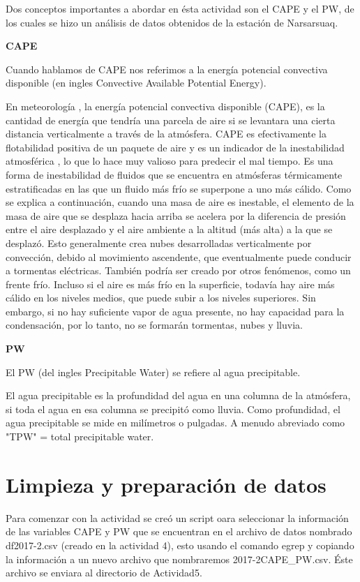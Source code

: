 \documentclass[12pt]{article}
\begin{document}
Dos conceptos importantes a abordar en ésta actividad son el CAPE y el PW, de los cuales se hizo un análisis de datos obtenidos de la estación de Narsarsuaq.

\textbf{CAPE}

Cuando hablamos de CAPE nos referimos a la energía potencial convectiva disponible (en ingles Convective Available Potential Energy).

En meteorología , la energía potencial convectiva disponible (CAPE), es la cantidad de energía que tendría una parcela de aire si se levantara una cierta distancia verticalmente a través de la atmósfera. CAPE es efectivamente la flotabilidad positiva de un paquete de aire y es un indicador de la inestabilidad atmosférica , lo que lo hace muy valioso para predecir el mal tiempo. Es una forma de inestabilidad de fluidos que se encuentra en atmósferas térmicamente estratificadas en las que un fluido más frío se superpone a uno más cálido. Como se explica a continuación, cuando una masa de aire es inestable, el elemento de la masa de aire que se desplaza hacia arriba se acelera por la diferencia de presión entre el aire desplazado y el aire ambiente a la altitud (más alta) a la que se desplazó. Esto generalmente crea nubes desarrolladas verticalmente por convección, debido al movimiento ascendente, que eventualmente puede conducir a tormentas eléctricas. También podría ser creado por otros fenómenos, como un frente frío. Incluso si el aire es más frío en la superficie, todavía hay aire más cálido en los niveles medios, que puede subir a los niveles superiores. Sin embargo, si no hay suficiente vapor de agua presente, no hay capacidad para la condensación, por lo tanto, no se formarán tormentas, nubes y lluvia.

\textbf{PW}

El PW (del ingles Precipitable Water) se refiere al agua precipitable.

El agua precipitable es la profundidad del agua en una columna de la atmósfera, si toda el agua en esa columna se precipitó como lluvia. Como profundidad, el agua precipitable se mide en milímetros o pulgadas. A menudo abreviado como "TPW" = total precipitable water.

\section{Limpieza y preparación de datos}

Para comenzar con la actividad se creó un script oara seleccionar la información de las variables CAPE y PW que se encuentran en el archivo de datos nombrado df2017-2.csv (creado en la actividad 4), esto usando el comando egrep y copiando la información a un nuevo archivo que nombraremos 2017-2CAPE\_PW.csv. Éste archivo se enviara al directorio de Actividad5.
\end{document}
